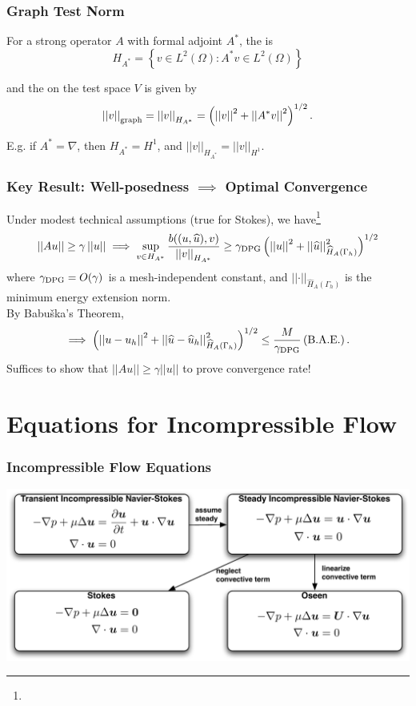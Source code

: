 \documentclass[mathserif]{beamer}
\newcommand{\NVRnorm}[1]{\left|\left|#1\right|\right|}
\newcommand{\NVRgrad}{\nabla}
\newcommand{\pecosbold}[1]{{\color{pecos2}{#1}}}
\newcommand{\FootSize}{\scriptsize}
\begin{document}
\begin{frame}
\frametitle{Graph Test Norm}

For a strong operator $A$ with formal adjoint $A^{*}$, the \pecosbold{adjoint graph space} is
\[
H_{A^{*}} = \left\{ v \in L^{2}(\Omega) : A^{*}v \in L^{2}(\Omega) \right\}
\]

and the \pecosbold{(adjoint) graph norm} on the test space $V$ is given by
\[
\NVRnorm{v}_{\rm graph} = \NVRnorm{v}_{H_{A^{*}}} = \left( \NVRnorm{v}^{2} + \NVRnorm{A^{*}v}^{2}\right)^{1/2}.
\]

\vspace{5mm}
\begin{center}
E.g. if $A^{*} = \NVRgrad$, then $H_{A^{*}} = H^{1}$, and $\NVRnorm{v}_{H_{A^{*}}} = \NVRnorm{v}_{H^{1}}$.
\end{center}
\end{frame}

\begin{frame}
\frametitle{Key Result: Well-posedness $\implies$ Optimal Convergence}
Under modest technical assumptions (true for Stokes), we have\footnote{\FootSize {}}\\
\[
\NVRnorm{Au} \geq \gamma \NVRnorm{u} \implies \sup_{v \in H_{A^{*}}} \frac{b((u,\widehat{u}),v)}{\NVRnorm{v}_{H_{A^{*}}}} \geq \gamma_{\rm DPG} \left(\NVRnorm{u}^{2} + \NVRnorm{\widehat{u}}^{2}_{\widehat{H}_{A}(\Gamma_{h})}\right)^{1/2}
\]
where $\gamma_{\rm DPG} = O(\gamma)$ is a mesh-independent constant, and $\NVRnorm{\cdot}_{\widehat{H}_{A}(\Gamma_{h})}$ is the minimum energy extension norm.\\
\pause
\vspace{5mm}
By Babu\v{s}ka's Theorem,
\[
\implies \left(\NVRnorm{u - u_{h}}^{2} + \NVRnorm{\widehat{u} - \widehat{u}_{h}}^{2}_{\widehat{H}_{A}(\Gamma_{h})}\right)^{1/2} \leq \frac{M}{\gamma_{\rm DPG}} \left( {\rm B.A.E.} \right).
\]
\pause
Suffices to show that $\NVRnorm{Au} \geq \gamma \NVRnorm{u}$ to prove \pecosbold{optimal} convergence rate!
\end{frame}

\section{Equations for Incompressible Flow}
\begin{frame}
\frametitle{Incompressible Flow Equations}
\begin{center}
\includegraphics[width=0.9\linewidth]{../figures/incFlowEqns}\\
\end{center}
\end{frame}
\end{document}
